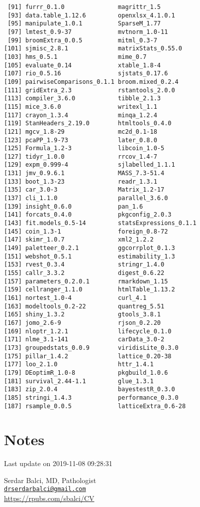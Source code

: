 \documentclass[]{article}
\begin{document}
\begin{verbatim}
 [91] furrr_0.1.0               magrittr_1.5             
 [93] data.table_1.12.6         openxlsx_4.1.0.1         
 [95] manipulate_1.0.1          SparseM_1.77             
 [97] lmtest_0.9-37             mvtnorm_1.0-11           
 [99] broomExtra_0.0.5          mitml_0.3-7              
[101] sjmisc_2.8.1              matrixStats_0.55.0       
[103] hms_0.5.1                 mime_0.7                 
[105] evaluate_0.14             xtable_1.8-4             
[107] rio_0.5.16                sjstats_0.17.6           
[109] pairwiseComparisons_0.1.1 broom.mixed_0.2.4        
[111] gridExtra_2.3             rstantools_2.0.0         
[113] compiler_3.6.0            tibble_2.1.3             
[115] mice_3.6.0                writexl_1.1              
[117] crayon_1.3.4              minqa_1.2.4              
[119] StanHeaders_2.19.0        htmltools_0.4.0          
[121] mgcv_1.8-29               mc2d_0.1-18              
[123] pcaPP_1.9-73              later_0.8.0              
[125] Formula_1.2-3             libcoin_1.0-5            
[127] tidyr_1.0.0               rrcov_1.4-7              
[129] expm_0.999-4              sjlabelled_1.1.1         
[131] jmv_0.9.6.1               MASS_7.3-51.4            
[133] boot_1.3-23               readr_1.3.1              
[135] car_3.0-3                 Matrix_1.2-17            
[137] cli_1.1.0                 parallel_3.6.0           
[139] insight_0.6.0             pan_1.6                  
[141] forcats_0.4.0             pkgconfig_2.0.3          
[143] fit.models_0.5-14         statsExpressions_0.1.1   
[145] coin_1.3-1                foreign_0.8-72           
[147] skimr_1.0.7               xml2_1.2.2               
[149] paletteer_0.2.1           ggcorrplot_0.1.3         
[151] webshot_0.5.1             estimability_1.3         
[153] rvest_0.3.4               stringr_1.4.0            
[155] callr_3.3.2               digest_0.6.22            
[157] parameters_0.2.0.1        rmarkdown_1.15           
[159] cellranger_1.1.0          htmlTable_1.13.2         
[161] nortest_1.0-4             curl_4.1                 
[163] modeltools_0.2-22         quantreg_5.51            
[165] shiny_1.3.2               gtools_3.8.1             
[167] jomo_2.6-9                rjson_0.2.20             
[169] nloptr_1.2.1              lifecycle_0.1.0          
[171] nlme_3.1-141              carData_3.0-2            
[173] groupedstats_0.0.9        viridisLite_0.3.0        
[175] pillar_1.4.2              lattice_0.20-38          
[177] loo_2.1.0                 httr_1.4.1               
[179] DEoptimR_1.0-8            pkgbuild_1.0.6           
[181] survival_2.44-1.1         glue_1.3.1               
[183] zip_2.0.4                 bayestestR_0.3.0         
[185] stringi_1.4.3             performance_0.3.0        
[187] rsample_0.0.5             latticeExtra_0.6-28      
\end{verbatim}

\pagebreak

\hypertarget{notes}{%
\section{Notes}\label{notes}}

Last update on 2019-11-08 09:28:31

Serdar Balci, MD, Pathologist\\
\href{mailto:drserdarbalci@gmail.com}{\nolinkurl{drserdarbalci@gmail.com}}\\
\url{https://rpubs.com/sbalci/CV}

\pagebreak

\newpage
\end{document}
